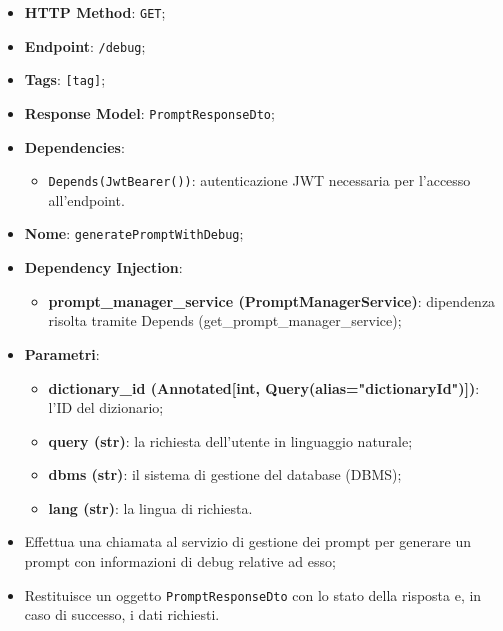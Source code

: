 \begin{itemize}
  \item \textbf{HTTP Method}: \texttt{GET};
  \item \textbf{Endpoint}: \texttt{/debug};
  \item \textbf{Tags}: \texttt{[tag]};
  \item \textbf{Response Model}: \texttt{PromptResponseDto};
  \item \textbf{Dependencies}:
    \begin{itemize}
      \item \texttt{Depends(JwtBearer())}: autenticazione JWT necessaria per l'accesso all'endpoint.
    \end{itemize}
  \item \textbf{Nome}: \texttt{generatePromptWithDebug};
  \item \textbf{Dependency Injection}:
  \begin{itemize}
    \item \textbf{prompt\_manager\_service (PromptManagerService)}: dipendenza risolta tramite Depends (get\_prompt\_manager\_service);
  \end{itemize}
  \item \textbf{Parametri}:
  \begin{itemize}
    \item \textbf{dictionary\_id (Annotated[int, Query(alias="dictionaryId")])}: l'ID del dizionario;
    \item \textbf{query (str)}: la richiesta dell'utente in linguaggio naturale;
    \item \textbf{dbms (str)}: il sistema di gestione del database (DBMS);
    \item \textbf{lang (str)}: la lingua di richiesta.
  \end{itemize}
\end{itemize}

\begin{itemize}
  \item Effettua una chiamata al servizio di gestione dei prompt per generare un prompt con informazioni di debug relative ad esso;
  \item Restituisce un oggetto \texttt{PromptResponseDto} con lo stato della risposta e, in caso di successo, i dati richiesti.
\end{itemize}



